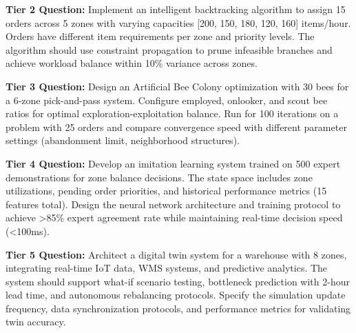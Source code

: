 \documentclass{article}
\begin{document}
\textbf{Tier 2 Question:} Implement an intelligent backtracking algorithm to assign 15 orders across 5 zones with varying capacities [200, 150, 180, 120, 160] items/hour. Orders have different item requirements per zone and priority levels. The algorithm should use constraint propagation to prune infeasible branches and achieve workload balance within 10\% variance across zones.

\textbf{Tier 3 Question:} Design an Artificial Bee Colony optimization with 30 bees for a 6-zone pick-and-pass system. Configure employed, onlooker, and scout bee ratios for optimal exploration-exploitation balance. Run for 100 iterations on a problem with 25 orders and compare convergence speed with different parameter settings (abandonment limit, neighborhood structures).

\textbf{Tier 4 Question:} Develop an imitation learning system trained on 500 expert demonstrations for zone balance decisions. The state space includes zone utilizations, pending order priorities, and historical performance metrics (15 features total). Design the neural network architecture and training protocol to achieve >85\% expert agreement rate while maintaining real-time decision speed (<100ms).

\textbf{Tier 5 Question:} Architect a digital twin system for a warehouse with 8 zones, integrating real-time IoT data, WMS systems, and predictive analytics. The system should support what-if scenario testing, bottleneck prediction with 2-hour lead time, and autonomous rebalancing protocols. Specify the simulation update frequency, data synchronization protocols, and performance metrics for validating twin accuracy.
\end{document}
